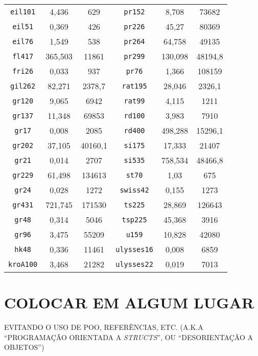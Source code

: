 \begin{table}[tp!]
{\begin{tabular}{cccccc}
\texttt{eil101}    &  4,436    & 629     & \texttt{pr152}     & 8,708   & 73682   \\
\texttt{eil51}     &  0,369    & 426     & \texttt{pr226}     & 45,27   & 80369   \\
\texttt{eil76}     &  1,549    & 538     & \texttt{pr264}     & 64,758  & 49135   \\
\texttt{fl417}     &  365,503  & 11861   & \texttt{pr299}     & 130,098 & 48194,8 \\
\texttt{fri26}     &  0,033    & 937     & \texttt{pr76}      & 1,366   & 108159  \\
\texttt{gil262}    &  82,271   & 2378,7  & \texttt{rat195}    & 28,046  & 2326,1  \\
\texttt{gr120}     &  9,065    & 6942    & \texttt{rat99}     & 4,115   & 1211    \\
\texttt{gr137}     &  11,348   & 69853   & \texttt{rd100}     & 3,983   & 7910    \\
\texttt{gr17}      &  0,008    & 2085    & \texttt{rd400}     & 498,288 & 15296,1 \\
\texttt{gr202}     &  37,105   & 40160,1 & \texttt{si175}     & 17,333  & 21407   \\
\texttt{gr21}      &  0,014    & 2707    & \texttt{si535}     & 758,534 & 48466,8 \\
\texttt{gr229}     &  61,498   & 134613  & \texttt{st70}      & 1,03    & 675     \\
\texttt{gr24}      &  0,028    & 1272    & \texttt{swiss42}   & 0,155   & 1273    \\
\texttt{gr431}     &  721,745  & 171530  & \texttt{ts225}     & 28,869  & 126643  \\
\texttt{gr48}      &  0,314    & 5046    & \texttt{tsp225}    & 45,368  & 3916    \\
\texttt{gr96}      &  3,475    & 55209   & \texttt{u159}      & 10,828  & 42080   \\
\texttt{hk48}      &  0,336    & 11461   & \texttt{ulysses16} & 0,008   & 6859    \\
\texttt{kroA100}   &  3,468    & 21282   & \texttt{ulysses22} & 0,019   & 7013    \\
\bottomrule
\end{tabular}
}
\end{table}
\iffalse
\chapter*{COLOCAR EM ALGUM LUGAR}
{\color{red}EVITANDO O USO DE POO, REFERÊNCIAS, ETC. (A.K.A ``PROGRAMAÇÃO ORIENTADA A \textit{STRUCTS}'', OU ``DESORIENTAÇÃO A OBJETOS'')}

